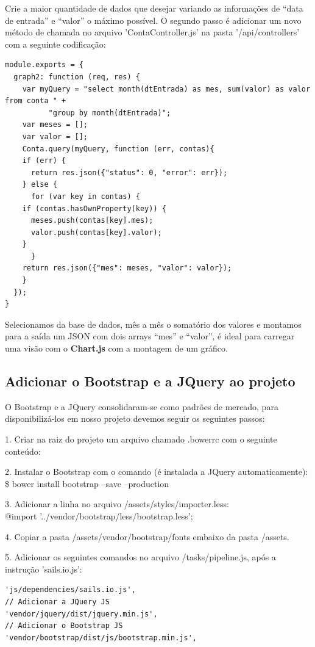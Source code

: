 \documentclass[a4paper,11pt]{article}
\begin{document}
Crie a maior quantidade de dados que desejar variando as informações de ``data de entrada'' e ``valor'' o máximo possível. O segundo passo é adicionar um novo método de chamada no arquivo 'ContaController.js' na pasta '/api/controllers' com a seguinte codificação:
\begin{lstlisting}
module.exports = {
  graph2: function (req, res) {
    var myQuery = "select month(dtEntrada) as mes, sum(valor) as valor from conta " +
 		  "group by month(dtEntrada)";
    var meses = [];
    var valor = [];
    Conta.query(myQuery, function (err, contas){
    if (err) {
      return res.json({"status": 0, "error": err});
    } else {
      for (var key in contas) {
	if (contas.hasOwnProperty(key)) {
	  meses.push(contas[key].mes);
	  valor.push(contas[key].valor);
	}
      }
    return res.json({"mes": meses, "valor": valor});
    }
  });
}
\end{lstlisting}

Selecionamos da base de dados, mês a mês o somatório dos valores e montamos para a saída um JSON com dois arrays ``mes'' e ``valor'', é ideal para carregar uma visão com o \textbf{Chart.js} com a montagem de um gráfico.

\subsection{Adicionar o Bootstrap e a JQuery ao projeto}
O Bootstrap e a JQuery consolidaram-se como padrões de mercado, para disponibilizá-los em nosso projeto devemos seguir os seguintes passos:

1. Criar na raiz do projeto um arquivo chamado .bowerrc com o seguinte conteúdo: \\
 \textbraceright

2. Instalar o Bootstrap com o comando (é instalada a JQuery automaticamente): \\
{\ttfamily\$ bower install bootstrap --save --production}

3. Adicionar a linha no arquivo /assets/styles/importer.less: \\
{\ttfamily @import '../vendor/bootstrap/less/bootstrap.less';}

4. Copiar a pasta /assets/vendor/bootstrap/fonts embaixo da pasta /assets.

5. Adicionar os seguintes comandos no arquivo /tasks/pipeline.js, após a instrução 'sails.io.js':
\begin{lstlisting}
'js/dependencies/sails.io.js',
// Adicionar a JQuery JS
'vendor/jquery/dist/jquery.min.js',
// Adicionar o Bootstrap JS
'vendor/bootstrap/dist/js/bootstrap.min.js',
\end{lstlisting}
\end{document}

